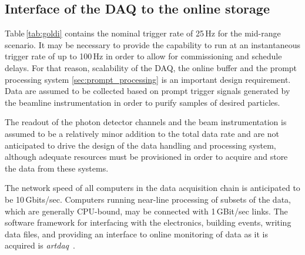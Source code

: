 \subsection{Interface of the DAQ to the online storage}
\label{sec:DAQ_online_interface}



Table\,\ref{tab:goldi} contains the nominal trigger rate of 25\,Hz for
the mid-range scenario. It may be necessary to provide the capability
to run at  an instantaneous trigger rate of up to 100\,Hz in order to
allow for commissioning and schedule delays. For that reason,
scalability of the DAQ, the online buffer and the prompt processing system
\ref{sec:prompt_processing} is an important design requirement.
 Data are assumed to be
collected based on prompt trigger signals generated by the beamline
instrumentation in order to purify samples of desired particles.

The readout of the photon detector channels and the beam
instrumentation is assumed to be a relatively minor addition to the
total data rate and are not anticipated to drive the design of the
data handling and processing system, although adequate resources must
be provisioned in order to acquire and store the data from these
systems.

The network speed of all computers in the data acquisition
chain is anticipated to be 10\,Gbits/sec.  Computers running near-line
processing of subsets of the data, which are generally CPU-bound, may
be connected with 1\,GBit/sec links.  The software framework for
interfacing with the electronics, building events, writing data files,
and providing an interface to online monitoring of data as it is
acquired is {\it artdaq}~\cite{artdaq}.

